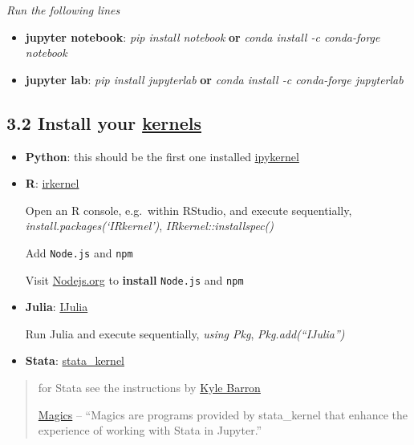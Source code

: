 \documentclass[
  12pt,
]{article}
\providecommand{\tightlist}{%
  \setlength{\itemsep}{0pt}\setlength{\parskip}{0pt}}
\begin{document}
\emph{\emph{Run the following lines}}

\begin{itemize}
\tightlist
\item
  \textbf{jupyter notebook}: \emph{pip install notebook} \textbf{or}
  \emph{conda install -c conda-forge notebook}
\item
  \textbf{jupyter lab}: \emph{pip install jupyterlab} \textbf{or}
  \emph{conda install -c conda-forge jupyterlab}
\end{itemize}

\hypertarget{install-your-kernels}{%
\subsection{\texorpdfstring{3.2 Install your
\href{https://github.com/jupyter/jupyter/wiki/Jupyter-kernels}{kernels}}{3.2 Install your kernels}}\label{install-your-kernels}}

\begin{itemize}
\item
  \textbf{Python}: this should be the first one installed
  \href{https://pypi.org/project/ipykernel/}{ipykernel}
\item
  \textbf{R}: \href{https://irkernel.github.io/installation/}{irkernel}

  Open an R console, e.g.~within RStudio, and execute sequentially,
  \emph{install.packages(`IRkernel')}, \emph{IRkernel::installspec()}

  Add \texttt{Node.js} and \texttt{npm}

  Visit \href{https://nodejs.org/en/download/}{Nodejs.org} to
  \textbf{install} \texttt{Node.js} and \texttt{npm}
\item
  \textbf{Julia}: \href{https://github.com/JuliaLang/IJulia.jl}{IJulia}

  Run Julia and execute sequentially, \emph{using Pkg},
  \emph{Pkg.add(``IJulia'')}
\item
  \textbf{Stata}:
  \href{https://github.com/kylebarron/stata_kernel}{stata\_kernel}
\end{itemize}

\begin{quote}
for Stata see the instructions by
\href{https://kylebarron.dev/stata_kernel/getting_started/}{Kyle Barron}

\href{https://kylebarron.dev/stata_kernel/using_stata_kernel/magics/}{Magics}
-- ``Magics are programs provided by stata\_kernel that enhance the
experience of working with Stata in Jupyter.''
\end{quote}
\end{document}

